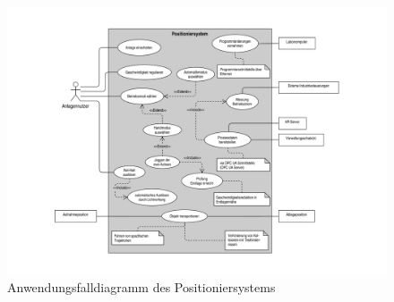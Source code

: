 \documentclass[../Bachelorarbeit.tex]{subfiles}
\begin{document}
\begin{figure}[h]
    \centering
    \includegraphics[width=\textwidth]{Images/use_case_dia.pdf}
    \caption[Anwendungsfalldiagramm]{Anwendungsfalldiagramm des Positioniersystems}
    \label{fig:my-img3}
\end{figure}
\end{document}

